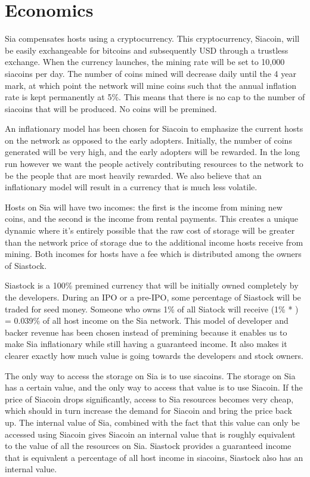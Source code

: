 \documentclass[twocolumn]{article}
\begin{document}
\section{Economics}

Sia compensates hosts using a cryptocurrency.
This cryptocurrency, Siacoin, will be easily exchangeable for bitcoins and subsequently USD through a trustless exchange.
When the currency launches, the mining rate will be set to 10,000 siacoins per day.
The number of coins mined will decrease daily until the 4 year mark, at which point the network will mine coins such that the annual inflation rate is kept permanently at 5\%.
This means that there is no cap to the number of siacoins that will be produced.
No coins will be premined.

An inflationary model has been chosen for Siacoin to emphasize the current hosts on the network as opposed to the early adopters.
Initially, the number of coins generated will be very high, and the early adopters will be rewarded.
In the long run however we want the people actively contributing resources to the network to be the people that are most heavily rewarded.
We also believe that an inflationary model will result in a currency that is much less volatile.

Hosts on Sia will have two incomes: the first is the income from mining new coins, and the second is the income from rental payments.
This creates a unique dynamic where it's entirely possible that the raw cost of storage will be greater than the network price of storage due to the additional income hosts receive from mining.
Both incomes for hosts have a \hostincomefee{} fee which is distributed among the owners of Siastock.

Siastock is a 100\% premined currency that will be initially owned completely by the developers.
During an IPO or a pre-IPO, some percentage of Siastock will be traded for seed money.
Someone who owns 1\% of all Siatock will receive (1\% * \hostincomefee{}) = 0.039\% of all host income on the Sia network.
This model of developer and backer revenue has been chosen instead of premining because it enables us to make Sia inflationary while still having a guaranteed income.
It also makes it clearer exactly how much value is going towards the developers and stock owners.

The only way to access the storage on Sia is to use siacoins.
The storage on Sia has a certain value, and the only way to access that value is to use Siacoin.
If the price of Siacoin drops significantly, access to Sia resources becomes very cheap, which should in turn increase the demand for Siacoin and bring the price back up.
The internal value of Sia, combined with the fact that this value can only be accessed using Siacoin gives Siacoin an internal value that is roughly equivalent to the value of all the resources on Sia.
Siastock provides a guaranteed income that is equivalent a percentage of all host income in siacoins, Siastock also has an internal value.
\end{document}
